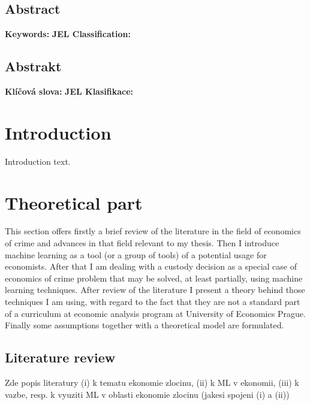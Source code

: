 \documentclass[12pt, twoside]{book} %
\renewcommand{\baselinestretch}{1.5}
\begin{document}
\section*{Abstract}   %
\textbf{Keywords:} \newline
\textbf{JEL Classification:}


\section*{Abstrakt}
\textbf{Klíčová slova:} \newline
\textbf{JEL Klasifikace:}

\tableofcontents    %
\renewcommand{\thepage}{\arabic{page}}
\renewcommand{\baselinestretch}{1.5}


\chapter*{Introduction}     %
\pagestyle{plain}
Introduction text.


\chapter{Theoretical part}    %
This section offers firstly a brief review of the literature in the field of economics of crime and advances in that field relevant to my thesis. Then I introduce machine learning as a tool (or a group of tools) of a potential usage for economists. After that I am dealing with a custody decision as a special case of economics of crime problem that may be solved, at least partially, using machine learning techniques.\newline
After review of the literature I present a theory behind those techniques I am using, with regard to the fact that they are not a standard part of a curriculum at economic analysis program at University of Economics Prague. Finally some assumptions together with a theoretical model are formulated. 

\section{Literature review}     %

Zde popis literatury (i) k tematu ekonomie zlocinu, (ii) k ML v ekonomii, (iii) k vazbe, resp. k vyuziti ML v oblasti ekonomie zlocinu (jakesi spojeni (i) a (ii))
\end{document}
